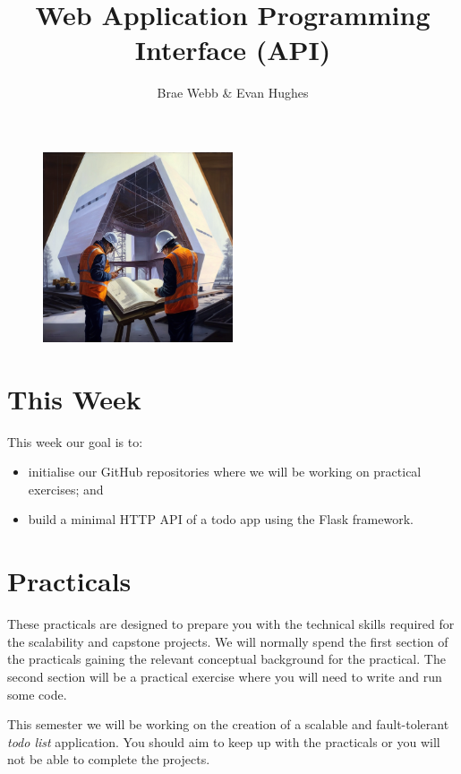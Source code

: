 \documentclass{csse4400}
\title{Web Application Programming Interface (API)}
\author{Brae Webb \& Evan Hughes}
\date{\week{1}}
\begin{document}
\maketitle

\begin{figure}[h]
    \centering
    \includegraphics[width=0.5\textwidth]{images/header}
\end{figure}

\section{This Week}
This week our goal is to:
\begin{itemize}
  \item initialise our GitHub repositories where we will be working on practical exercises; and
  \item build a minimal HTTP API of a todo app using the Flask framework.
\end{itemize}

\section{Practicals}
These practicals are designed to prepare you with the technical skills required for the scalability and capstone projects.
We will normally spend the first section of the practicals gaining the relevant conceptual background for the practical.
The second section will be a practical exercise where you will need to write and run some code.

This semester we will be working on the creation of a scalable and fault-tolerant \textsl{todo list} application.
You should aim to keep up with the practicals or you will not be able to complete the projects.
\end{document}
